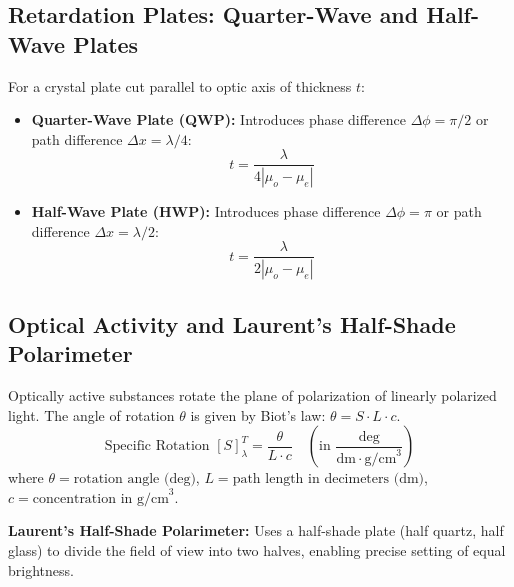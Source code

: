 \documentclass[12pt,a4paper]{article}
\begin{document}
\subsection{Retardation Plates: Quarter-Wave and Half-Wave Plates}

\begin{tcolorbox}[formulabox, title={\textbf{Retardation Plate Thickness Equations}}]
For a crystal plate cut parallel to optic axis of thickness $t$:
\begin{itemize}[leftmargin=*, itemsep=3pt]
  \item \textbf{Quarter-Wave Plate (QWP):} Introduces phase difference $\Delta \phi = \pi/2$ or path difference $\Delta x = \lambda/4$:
  \begin{equation}
  t = \frac{\lambda}{4 |\mu_o - \mu_e|}
  \end{equation}
  \item \textbf{Half-Wave Plate (HWP):} Introduces phase difference $\Delta \phi = \pi$ or path difference $\Delta x = \lambda/2$:
  \begin{equation}
  t = \frac{\lambda}{2 |\mu_o - \mu_e|}
  \end{equation}
\end{itemize}
\end{tcolorbox}

\subsection{Optical Activity and Laurent's Half-Shade Polarimeter}

Optically active substances rotate the plane of polarization of linearly polarized light.
The angle of rotation $\theta$ is given by Biot's law: $\theta = S \cdot L \cdot c$.
\begin{equation}
\text{Specific Rotation } [S]_\lambda^T = \frac{\theta}{L \cdot c} \quad \left(\text{in } \frac{\text{deg}}{\text{dm} \cdot \text{g/cm}^3}\right)
\end{equation}
where $\theta = \text{rotation angle (deg)}$, $L = \text{path length in decimeters (dm)}$, $c = \text{concentration in g/cm}^3$.

\textbf{Laurent's Half-Shade Polarimeter:} Uses a half-shade plate (half quartz, half glass) to divide the field of view into two halves, enabling precise setting of equal brightness.
\end{document}
